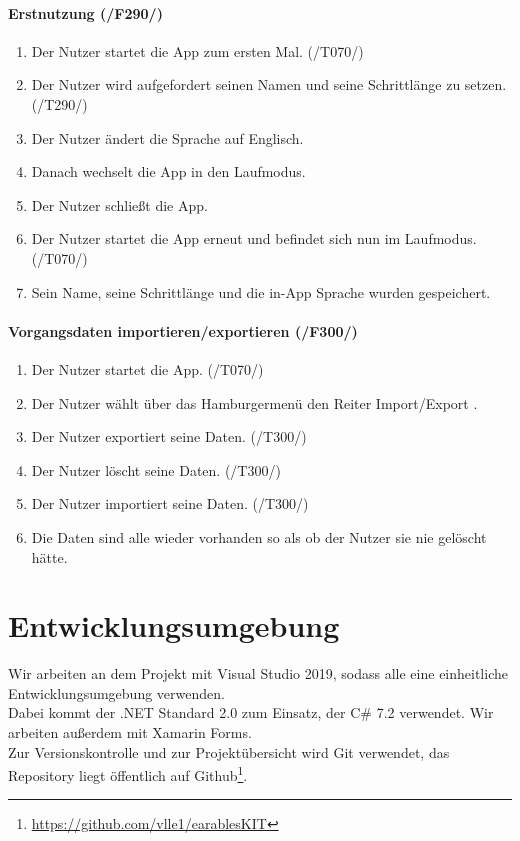 \documentclass[a4paper,12pt]{article}
\begin{document}
      \paragraph{Erstnutzung (/F290/)}
      \begin{enumerate}
        \item Der Nutzer startet die App zum ersten Mal. (/T070/)
        \item Der Nutzer wird aufgefordert seinen Namen und seine Schrittlänge zu setzen. (/T290/)
        \item Der Nutzer ändert die Sprache auf Englisch.
        \item Danach wechselt die App in den \glqq Laufmodus\grqq.
        \item Der Nutzer schließt die App.
        \item Der Nutzer startet die App erneut und befindet sich nun im \glqq Laufmodus\grqq. (/T070/)
        \item Sein Name, seine Schrittlänge und die in-App Sprache wurden gespeichert.
      \end{enumerate}

      \paragraph{Vorgangsdaten importieren/exportieren (/F300/)}
      \begin{enumerate}
        \item Der Nutzer startet die App. (/T070/)
        \item Der Nutzer wählt über das Hamburgermenü den Reiter \glqq{}Import/Export \grqq{}.
        \item Der Nutzer exportiert seine Daten. (/T300/)
        \item Der Nutzer löscht seine Daten. (/T300/)
        \item Der Nutzer importiert seine Daten. (/T300/)
        \item Die Daten sind alle wieder vorhanden so als ob der Nutzer sie nie gelöscht hätte.
      \end{enumerate}

\section{Entwicklungsumgebung}
Wir arbeiten an dem Projekt mit Visual Studio 2019, sodass alle eine einheitliche Entwicklungsumgebung verwenden.\\
Dabei kommt der .NET Standard 2.0 zum Einsatz, der C\# 7.2 verwendet. Wir arbeiten außerdem mit Xamarin Forms.\\
Zur Versionskontrolle und zur Projektübersicht wird Git verwendet, das Repository liegt öffentlich auf Github\footnote{\url{https://github.com/vlle1/earablesKIT}}.
\clearpage
\printglossaries
{}
\end{document}
